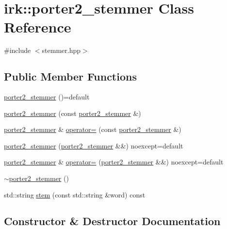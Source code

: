 \hypertarget{classirk_1_1porter2__stemmer}{}\section{irk\+:\+:porter2\+\_\+stemmer Class Reference}
\label{classirk_1_1porter2__stemmer}


{\ttfamily \#include $<$stemmer.\+hpp$>$}

\subsection*{Public Member Functions}
\begin{DoxyCompactItemize}
\item 
\mbox{\hyperlink{classirk_1_1porter2__stemmer_a59fc8bbada850d981d256bed2c38a374}{porter2\+\_\+stemmer}} ()=default
\item 
\mbox{\hyperlink{classirk_1_1porter2__stemmer_ad805217cc80850c285c036de58d72be6}{porter2\+\_\+stemmer}} (const \mbox{\hyperlink{classirk_1_1porter2__stemmer}{porter2\+\_\+stemmer}} \&)
\item 
\mbox{\hyperlink{classirk_1_1porter2__stemmer}{porter2\+\_\+stemmer}} \& \mbox{\hyperlink{classirk_1_1porter2__stemmer_ab8f5da2b51706c25c5c006e6e6760279}{operator=}} (const \mbox{\hyperlink{classirk_1_1porter2__stemmer}{porter2\+\_\+stemmer}} \&)
\item 
\mbox{\hyperlink{classirk_1_1porter2__stemmer_a18ebcde742603f2fe43e4e179717f0ba}{porter2\+\_\+stemmer}} (\mbox{\hyperlink{classirk_1_1porter2__stemmer}{porter2\+\_\+stemmer}} \&\&) noexcept=default
\item 
\mbox{\hyperlink{classirk_1_1porter2__stemmer}{porter2\+\_\+stemmer}} \& \mbox{\hyperlink{classirk_1_1porter2__stemmer_ace0dffc8932883ea73459b05251c7293}{operator=}} (\mbox{\hyperlink{classirk_1_1porter2__stemmer}{porter2\+\_\+stemmer}} \&\&) noexcept=default
\item 
\mbox{\hyperlink{classirk_1_1porter2__stemmer_a87ef9d75a0931a43e409f5d05fe6238a}{$\sim$porter2\+\_\+stemmer}} ()
\item 
std\+::string \mbox{\hyperlink{classirk_1_1porter2__stemmer_a81a8cfefee92421e6bf88cbab78f5cf3}{stem}} (const std\+::string \&word) const
\end{DoxyCompactItemize}


\subsection{Constructor \& Destructor Documentation}
\mbox{\label{classirk_1_1porter2__stemmer_a59fc8bbada850d981d256bed2c38a374}} 
